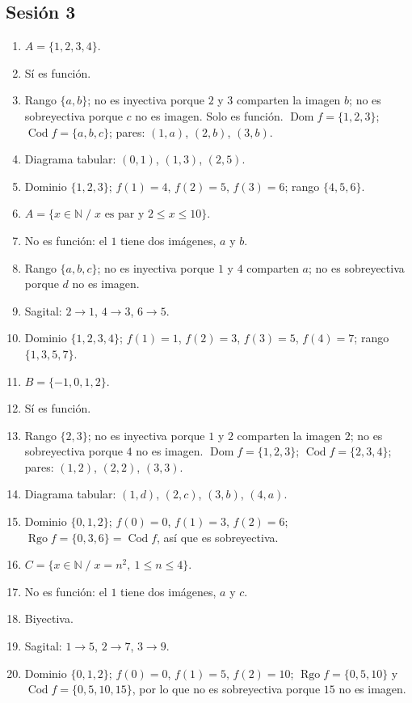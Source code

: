 \documentclass[12pt, letterpaper]{article}
\newcommand{\N}{\mathbb{N}}
\begin{document}
\subsection*{Sesión 3}
\begin{enumerate}[leftmargin=*, label=\textbf{\arabic*.}]
  \item $A=\{1,2,3,4\}$.
  \item Sí es función.
  \item Rango $\{a,b\}$; no es inyectiva porque $2$ y $3$ comparten la imagen $b$; no es sobreyectiva porque $c$ no es imagen. Solo es función. $\operatorname{Dom} f=\{1,2,3\}$; $\operatorname{Cod} f=\{a,b,c\}$; pares: $(1,a)$, $(2,b)$, $(3,b)$.
  \item Diagrama tabular: $(0,1)$, $(1,3)$, $(2,5)$.
  \item Dominio $\{1,2,3\}$; $f(1)=4$, $f(2)=5$, $f(3)=6$; rango $\{4,5,6\}$.
  \item $A=\{x\in\N \;/\; x \text{ es par y } 2\le x\le 10\}$.
  \item No es función: el $1$ tiene dos imágenes, $a$ y $b$.
  \item Rango $\{a,b,c\}$; no es inyectiva porque $1$ y $4$ comparten $a$; no es sobreyectiva porque $d$ no es imagen.
  \item Sagital: $2\to1$, $4\to3$, $6\to5$.
  \item Dominio $\{1,2,3,4\}$; $f(1)=1$, $f(2)=3$, $f(3)=5$, $f(4)=7$; rango $\{1,3,5,7\}$.
  \item $B=\{-1,0,1,2\}$.
  \item Sí es función.
  \item Rango $\{2,3\}$; no es inyectiva porque $1$ y $2$ comparten la imagen $2$; no es sobreyectiva porque $4$ no es imagen. $\operatorname{Dom} f=\{1,2,3\}$; $\operatorname{Cod} f=\{2,3,4\}$; pares: $(1,2)$, $(2,2)$, $(3,3)$.
  \item Diagrama tabular: $(1,d)$, $(2,c)$, $(3,b)$, $(4,a)$.
  \item Dominio $\{0,1,2\}$; $f(0)=0$, $f(1)=3$, $f(2)=6$; $\operatorname{Rgo} f=\{0,3,6\}=\operatorname{Cod} f$, así que es sobreyectiva.
  \item $C=\{x\in\N \;/\; x=n^2,\ 1\le n\le 4\}$.
  \item No es función: el $1$ tiene dos imágenes, $a$ y $c$.
  \item Biyectiva.
  \item Sagital: $1\to5$, $2\to7$, $3\to9$.
  \item Dominio $\{0,1,2\}$; $f(0)=0$, $f(1)=5$, $f(2)=10$; $\operatorname{Rgo} f=\{0,5,10\}$ y $\operatorname{Cod} f=\{0,5,10,15\}$, por lo que no es sobreyectiva porque $15$ no es imagen.
\end{enumerate}
\end{document}
